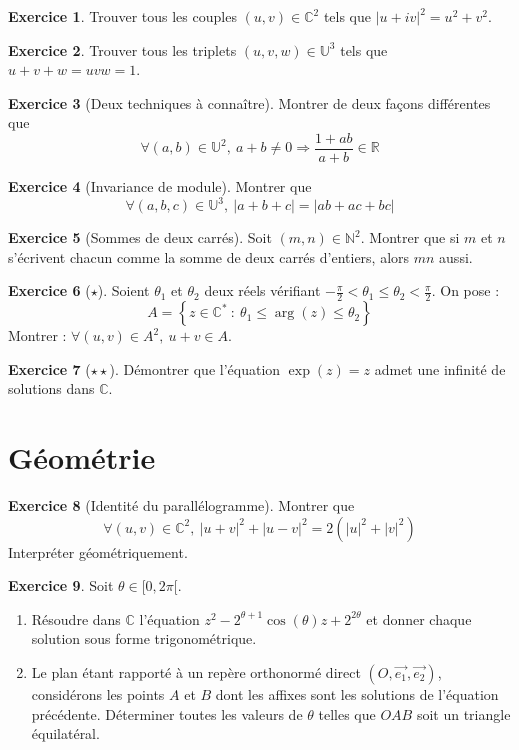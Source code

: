 \documentclass[french]{book}
\newcommand{\N}{\mathbb{N}}
\newcommand{\R}{\mathbb{R}}
\newcommand{\C}{\mathbb{C}}
\newcommand{\U}{\mathbb{U}}
\newcommand{\st}{^*}
\theoremstyle{definition}
\newtheorem{ex}{Exercice}[chapter]
\theoremstyle{theorem}
\theoremstyle{remark}
\begin{document}
\begin{ex}
	Trouver tous les couples $(u,v)\in\C^2$ tels que $\lvert u+iv\rvert^2=u^2+v^2$.
\end{ex}

\begin{ex}
	Trouver tous les triplets $(u,v,w)\in\U^3$ tels que $u+v+w=uvw=1$.
\end{ex}

\begin{ex}[Deux techniques à connaître]
	Montrer de deux façons différentes que $$ \forall (a,b) \in \U^2, \ a + b \ne 0 \Longrightarrow \frac{1+ab}{a+b} \in \R$$
\end{ex}

\begin{ex}[Invariance de module]
	Montrer que $$ \forall (a,b,c) \in \U^3, \ \lvert a+b+c\rvert = \lvert ab + ac+ bc\rvert$$
\end{ex}

\begin{ex}[Sommes de deux carrés]
	Soit $(m,n) \in \N^2$. Montrer que si $m$ et $n$ s'écrivent chacun comme la somme de deux carrés d'entiers, alors $mn$ aussi.
\end{ex}

\begin{ex}[$\star$]
	Soient $\theta_1$ et $\theta_2$ deux réels vérifiant $\displaystyle-\frac{\pi}{2}<\theta_1\leqslant\theta_2<\frac{\pi}{2}$. On pose : $$A=\left\{z\in\C\st\ : \ \theta_1\leqslant\arg(z)\leqslant\theta_2\right\}$$ Montrer : $\forall (u,v)\in A^2,\ u+v\in A$.
\end{ex}

\begin{ex}[$\star\star$]
	Démontrer que l'équation $\exp(z)=z$ admet une infinité de solutions dans $\C$.
\end{ex}

\section{Géométrie}

\begin{ex}[Identité du parallélogramme]
	Montrer que $$\forall (u,v) \in \C^2, \ \lvert u +v\rvert^2 +\lvert u-v\rvert^2 = 2(\lvert u\rvert^2 + \lvert v\rvert^2)$$ Interpréter géométriquement.
\end{ex}

\begin{ex}
	Soit $\theta\in[0,2\pi[$.
	\begin{enumerate}
		\item Résoudre dans $\C$ l'équation $z^2-2^{\theta+1}\cos(\theta)z+2^{2\theta}$ et donner chaque solution sous forme trigonométrique.
		\item Le plan étant rapporté à un repère orthonormé direct $(O,\overrightarrow{e_1},\overrightarrow{e_2})$, considérons les points $A$ et $B$ dont les affixes sont les solutions de l'équation précédente. Déterminer toutes les valeurs de $\theta$ telles que $OAB$ soit un triangle équilatéral.
	\end{enumerate}
\end{ex}
\end{document}

